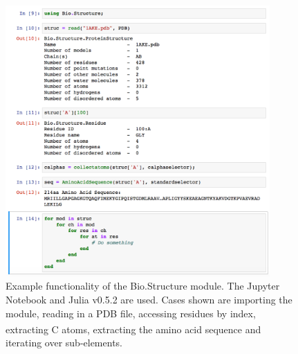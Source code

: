 \begin{figure}
\centering

\includegraphics[width=0.9\textwidth]{figures/biojulia_example/biojulia_example}

\caption[Example functionality of the Bio.Structure module in the Jupyter Notebook]
{Example functionality of the Bio.Structure module.
The Jupyter Notebook \cite{Kluyver2016} and Julia v0.5.2 are used.
Cases shown are importing the module, reading in a PDB file, accessing residues by index, extracting C\textsuperscript{\textalpha} atoms, extracting the amino acid sequence and iterating over sub-elements.}

\label{fig:biojulia_example}
\end{figure}


